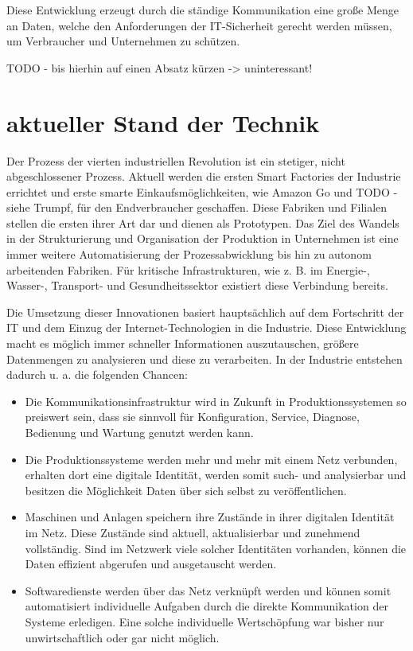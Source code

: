 \clearpage

Diese Entwicklung erzeugt durch die ständige Kommunikation eine große Menge an Daten, welche den Anforderungen der IT-Sicherheit gerecht werden müssen, um Verbraucher und Unternehmen zu schützen.

TODO - bis hierhin auf einen Absatz kürzen -> uninteressant!

\section{aktueller Stand der Technik}
Der Prozess der vierten industriellen Revolution ist ein stetiger, nicht abgeschlossener Prozess. Aktuell werden die ersten Smart Factories der Industrie errichtet und erste smarte Einkaufsmöglichkeiten, wie Amazon Go und TODO - siehe Trumpf, für den Endverbraucher geschaffen. Diese Fabriken und Filialen stellen die ersten ihrer Art dar und dienen als Prototypen. Das Ziel des Wandels in der Strukturierung und Organisation der Produktion in Unternehmen ist eine immer weitere Automatisierung der Prozessabwicklung bis hin zu autonom arbeitenden Fabriken. Für kritische Infrastrukturen, wie z. B. im Energie-, Wasser-, Transport- und Gesundheitssektor existiert diese Verbindung bereits.

Die Umsetzung dieser Innovationen basiert hauptsächlich auf dem Fortschritt der \ac{IT} und dem Einzug der Internet-Technologien in die Industrie. Diese Entwicklung macht es möglich immer schneller Informationen auszutauschen, größere Datenmengen zu analysieren und diese zu verarbeiten. In der Industrie entstehen dadurch u. a. die folgenden Chancen:

\begin{itemize}
  \item Die Kommunikationsinfrastruktur wird in Zukunft in Produktionssystemen so preiswert sein, dass sie sinnvoll für Konfiguration, Service, Diagnose, Bedienung und Wartung genutzt werden kann.
  \item Die Produktionssysteme werden mehr und mehr mit einem Netz verbunden, erhalten dort eine digitale Identität, werden somit such- und analysierbar und besitzen die Möglichkeit Daten über sich selbst zu veröffentlichen. 
  \item Maschinen und Anlagen speichern ihre Zustände in ihrer digitalen Identität im Netz. Diese Zustände sind aktuell, aktualisierbar und zunehmend vollständig. Sind im Netzwerk viele solcher Identitäten vorhanden, können die Daten effizient abgerufen und ausgetauscht werden.
  \item Softwaredienste werden über das Netz verknüpft werden und können somit automatisiert individuelle Aufgaben durch die direkte Kommunikation der Systeme erledigen. Eine solche individuelle Wertschöpfung war bisher nur unwirtschaftlich oder gar nicht möglich.
\end{itemize}


